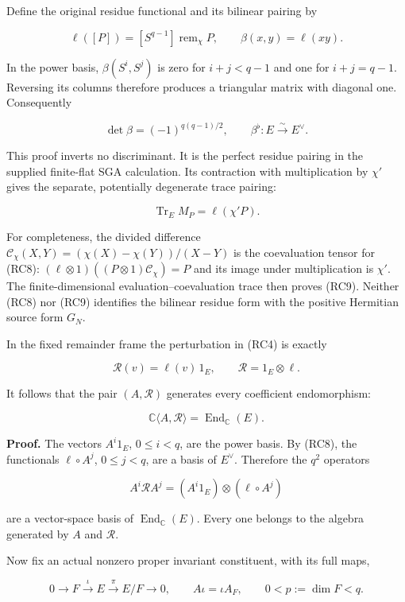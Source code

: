 \documentclass[
  11pt,
]{article}
\begin{document}
Define the original residue functional and its bilinear pairing by

\[
\ell([P])=[S^{q-1}]\operatorname{rem}_\chi P,
\qquad \beta(x,y)=\ell(xy).
\tag{RC7}
\]

In the power basis, \(\beta(S^i,S^j)\) is zero for \(i+j<q-1\) and one
for \(i+j=q-1\). Reversing its columns therefore produces a triangular
matrix with diagonal one. Consequently

\[
\det\beta=(-1)^{q(q-1)/2},\qquad
\beta^\flat:E\xrightarrow{\sim}E^\vee.
\tag{RC8}
\]

This proof inverts no discriminant. It is the perfect residue pairing in
the supplied finite-flat SGA calculation. Its contraction with
multiplication by \(\chi'\) gives the separate, potentially degenerate
trace pairing:

\[
\operatorname{Tr}_E M_P=\ell(\chi'P).
\tag{RC9}
\]

For completeness, the divided difference
\(\mathcal C_\chi(X,Y)=(\chi(X)-\chi(Y))/(X-Y)\) is the coevaluation
tensor for (RC8): \((\ell\otimes1)((P\otimes1)\mathcal C_\chi)=P\) and
its image under multiplication is \(\chi'\). The finite-dimensional
evaluation--coevaluation trace then proves (RC9). Neither (RC8) nor
(RC9) identifies the bilinear residue form with the positive Hermitian
source form \(G_N\).

In the fixed remainder frame the perturbation in (RC4) is exactly

\[
\boxed{\mathcal R(v)=\ell(v)\,1_E,
\qquad \mathcal R=1_E\otimes\ell.}
\tag{RC10}
\]

It follows that the pair \((A,\mathcal R)\) generates every coefficient
endomorphism:

\[
\boxed{\mathbb C\langle A,\mathcal R\rangle
=\operatorname{End}_{\mathbb C}(E).}
\tag{RC11}
\]

\textbf{Proof.} The vectors \(A^i1_E\), \(0\leq i<q\), are the power
basis. By (RC8), the functionals \(\ell\circ A^j\), \(0\leq j<q\), are a
basis of \(E^\vee\). Therefore the \(q^2\) operators

\[
A^i\mathcal R A^j=(A^i1_E)\otimes(\ell\circ A^j)
\tag{RC12}
\]

are a vector-space basis of \(\operatorname{End}_{\mathbb C}(E)\). Every
one belongs to the algebra generated by \(A\) and \(\mathcal R\).

Now fix an actual nonzero proper invariant constituent, with its full
maps,

\[
0\longrightarrow F\xrightarrow{\iota}E
\xrightarrow{\pi}E/F\longrightarrow0,
\qquad A\iota=\iota A_F,
\qquad 0<p:=\dim F<q.
\tag{RC13}
\]
\end{document}
